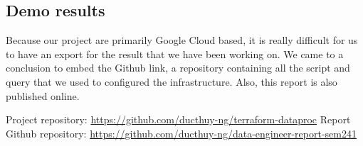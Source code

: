 \subsection{Demo results}

Because our project are primarily Google Cloud based, it is really difficult for us to have an
export for the result that we have been working on. We came to a conclusion to embed the Github
link, a repository containing all the script and query that we used to configured the
infrastructure. Also, this report is also published online.

Project repository: \url{https://github.com/ducthuy-ng/terraform-dataproc}
Report Github repository: \url{https://github.com/ducthuy-ng/data-engineer-report-sem241}